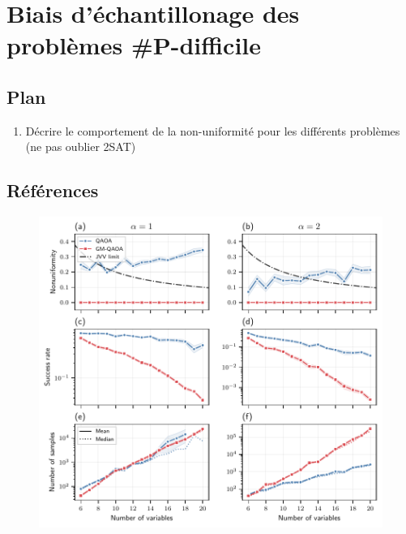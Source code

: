 
\section{Biais d'échantillonage des problèmes \textsf{\#P}-difficile}

\subsection*{Plan}

\begin{enumerate}
    \item Décrire le comportement de la non-uniformité pour les différents problèmes (ne pas oublier 2SAT)
\end{enumerate}

\subsection*{Références}

\begin{figure}[h]
    \centering
    \includegraphics[width=1\textwidth]{figures/nae3sat-number-of-samples.pdf}
    \caption{}
    \label{fig:nae3sat-number-of-samples}
\end{figure}

